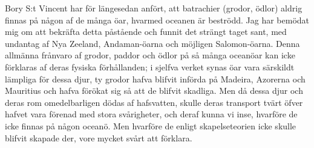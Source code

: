Bory S:t Vincent har för längesedan anfört, att batrachier (grodor, ödlor) aldrig finnas på någon af de många öar, hvarmed oceanen är beströdd. Jag har bemödat mig om att bekräfta detta påstående och funnit det strängt taget sant, med undantag af Nya Zeeland, Andaman-öarna och möjligen Salomon-öarna. Denna allmänna frånvaro af grodor, paddor och ödlor på så många oceanöar kan icke förklaras af deras fysiska förhållanden; i sjelfva verket synas öar vara särskildt lämpliga för dessa djur, ty grodor hafva blifvit införda på Madeira, Azorerna och Mauritius och hafva förökat sig så att de blifvit skadliga. Men då dessa djur och deras rom omedelbarligen dödas af hafsvatten, skulle deras transport tvärt öfver hafvet vara förenad med stora svårigheter, och deraf kunna vi inse, hvarföre de icke finnas på någon oceanö. Men hvarföre de enligt skapelseteorien icke skulle blifvit skapade der, vore mycket svårt att förklara.


